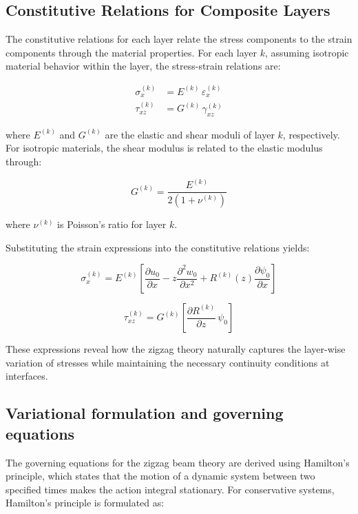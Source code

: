 \documentclass[12pt,a4paper]{report}
\begin{document}
\subsection{Constitutive Relations for Composite Layers}

The constitutive relations for each layer relate the stress components to the strain components through the material properties. For each layer $k$, assuming isotropic material behavior within the layer, the stress-strain relations are:

\begin{align}
\sigma_x^{(k)} &= E^{(k)} \, \varepsilon_x^{(k)} \\
\tau_{xz}^{(k)} &= G^{(k)} \, \gamma_{xz}^{(k)}
\end{align}



where $E^{(k)}$ and $G^{(k)}$ are the elastic and shear moduli of layer $k$, respectively. For isotropic materials, the shear modulus is related to the elastic modulus through:

\begin{equation}
G^{(k)} = \frac{E^{(k)}}{2 \left( 1 + \nu^{(k)} \right)}
\end{equation}


where $\nu^{(k)}$ is Poisson's ratio for layer $k$.

Substituting the strain expressions into the constitutive relations yields:

\begin{equation}
\sigma_x^{(k)} = E^{(k)} \left[ 
\frac{\partial u_0}{\partial x} 
- z \frac{\partial^2 w_0}{\partial x^2} 
+ R^{(k)}(z) \frac{\partial \psi_0}{\partial x} 
\right]
\end{equation}


\begin{equation}
\tau_{xz}^{(k)} = G^{(k)} \left[ 
\frac{\partial R^{(k)}}{\partial z} \, \psi_0 
\right]
\end{equation}


These expressions reveal how the zigzag theory naturally captures the layer-wise variation of stresses while maintaining the necessary continuity conditions at interfaces.

\subsection{Variational formulation and governing equations}
\label{sec:variational}


The governing equations for the zigzag beam theory are derived using Hamilton's principle, which states that the motion of a dynamic system between two specified times makes the action integral stationary. For conservative systems, Hamilton's principle is formulated as:
\end{document}
